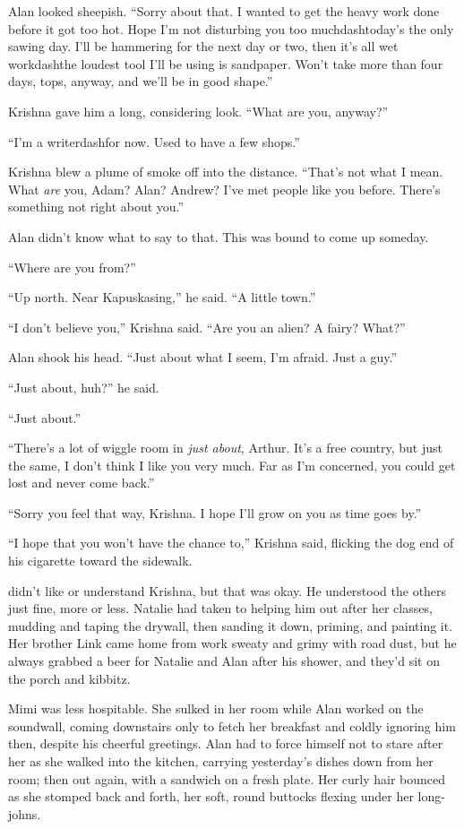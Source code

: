 Alan looked sheepish.  ``Sorry about that.  I wanted to get the heavy
work done before it got too hot.  Hope I'm not disturbing you too
muchdash{}today's the only sawing day.  I'll be hammering for the next
day or two, then it's all wet workdash{}the loudest tool I'll be using is
sandpaper.  Won't take more than four days, tops, anyway, and we'll be
in good shape.''

Krishna gave him a long, considering look.  ``What are you, anyway?''

``I'm a writerdash{}for now.  Used to have a few shops.''

Krishna blew a plume of smoke off into the distance.  ``That's not
what I mean.  What \textit{are} you, Adam?  Alan?  Andrew?  I've met
people like you before.  There's something not right about you.''

Alan didn't know what to say to that.  This was bound to come up
someday.

``Where are you from?''

``Up north.  Near Kapuskasing,'' he said.  ``A little town.''

``I don't believe you,'' Krishna said.  ``Are you an alien?  A fairy? 
What?''

Alan shook his head.  ``Just about what I seem, I'm afraid.  Just a
guy.''

``Just about, huh?'' he said.

``Just about.''

``There's a lot of wiggle room in \textit{just about}, Arthur.  It's a
free country, but just the same, I don't think I like you very much. 
Far as I'm concerned, you could get lost and never come back.''

``Sorry you feel that way, Krishna.  I hope I'll grow on you as time
goes by.''

``I hope that you won't have the chance to,'' Krishna said, flicking
the dog end of his cigarette toward the sidewalk.

 didn't like or understand Krishna, but that was okay.  He
understood the others just fine, more or less.  Natalie had taken to
helping him out after her classes, mudding and taping the drywall,
then sanding it down, priming, and painting it.  Her brother Link came
home from work sweaty and grimy with road dust, but he always grabbed
a beer for Natalie and Alan after his shower, and they'd sit on the
porch and kibbitz.

Mimi was less hospitable.  She sulked in her room while Alan worked on
the soundwall, coming downstairs only to fetch her breakfast and
coldly ignoring him then, despite his cheerful greetings.  Alan had to
force himself not to stare after her as she walked into the kitchen,
carrying yesterday's dishes down from her room; then out again, with a
sandwich on a fresh plate.  Her curly hair bounced as she stomped back
and forth, her soft, round buttocks flexing under her long-johns.

